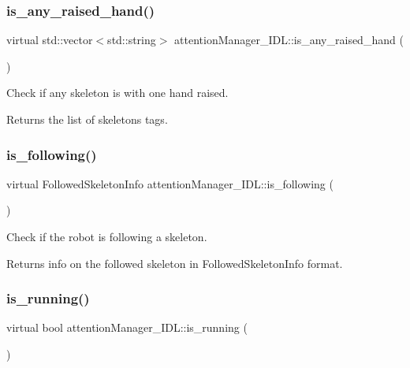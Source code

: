 \subsubsection{\texorpdfstring{is\_any\_raised\_hand()}{is\_any\_raised\_hand()}}
{\footnotesize\ttfamily virtual std\+::vector$<$std\+::string$>$ attention\+Manager\+\_\+\+I\+D\+L\+::is\+\_\+any\+\_\+raised\+\_\+hand (\begin{DoxyParamCaption}{ }\end{DoxyParamCaption})\hspace{0.3cm}{\ttfamily [virtual]}}



Check if any skeleton is with one hand raised. 

\begin{DoxyReturn}{Returns}
the list of skeletons\textquotesingle{} tags. 
\end{DoxyReturn}
\mbox{\label{classattentionManager__IDL_a03b844a8bd3d6e2b4cf5ba88ace27429}} 
\subsubsection{\texorpdfstring{is\_following()}{is\_following()}}
{\footnotesize\ttfamily virtual Followed\+Skeleton\+Info attention\+Manager\+\_\+\+I\+D\+L\+::is\+\_\+following (\begin{DoxyParamCaption}{ }\end{DoxyParamCaption})\hspace{0.3cm}{\ttfamily [virtual]}}



Check if the robot is following a skeleton. 

\begin{DoxyReturn}{Returns}
info on the followed skeleton in Followed\+Skeleton\+Info format. 
\end{DoxyReturn}
\mbox{\label{classattentionManager__IDL_ada750e5a7c6a0bb99be495e24d34dcdd}} 
\subsubsection{\texorpdfstring{is\_running()}{is\_running()}}
{\footnotesize\ttfamily virtual bool attention\+Manager\+\_\+\+I\+D\+L\+::is\+\_\+running (\begin{DoxyParamCaption}{ }\end{DoxyParamCaption})\hspace{0.3cm}{\ttfamily [virtual]}}



